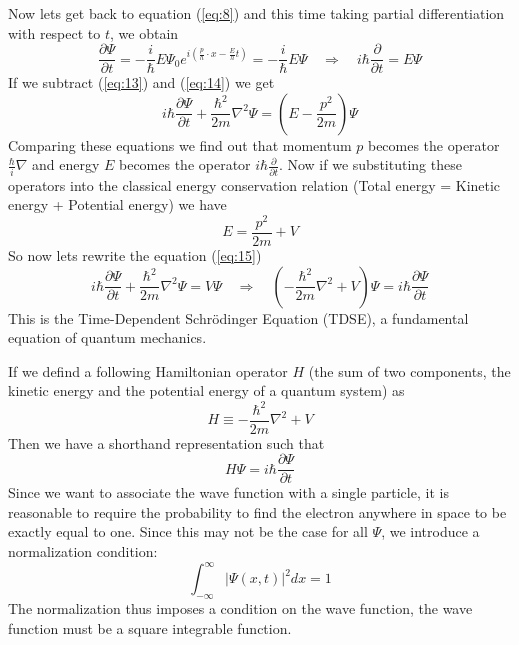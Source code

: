 \documentclass[11pt]{article}
\begin{document}
Now lets get back to equation (\ref{eq:8}) and this time taking partial differentiation with respect to $t$, we obtain
\begin{equation} \label{eq:14}
	\frac{\partial \Psi }{\partial t} = - \frac{i}{\hbar} E \Psi_0 e^{i(\frac{p}{h} \cdot x - \frac{E}{h} t)} = - \frac{i}{\hbar} E \Psi \quad \Rightarrow \quad 
	i \hbar \frac{\partial}{\partial t} = E \Psi
\end{equation}
If we subtract (\ref{eq:13}) and (\ref{eq:14}) we get
\begin{equation} \label{eq:15}
	i \hbar \frac{\partial \Psi}{\partial t} + \frac{\hbar ^2}{2m} \nabla^2 \Psi = (E - \frac{p^2}{2m}) \Psi
\end{equation}
Comparing these equations we find out that momentum $p$ becomes the operator $ \frac{\hbar}{i} \nabla$ and energy $E$ becomes the operator $ i \hbar \frac{\partial}{\partial t}$. Now if we substituting these operators into the classical energy conservation relation (Total energy = Kinetic energy + Potential energy) we have
\begin{equation}
	E = \frac{p^2}{2m} + V
\end{equation}
So now lets rewrite the equation (\ref{eq:15})
\begin{equation} \label{eq:TDSE}
	i \hbar \frac{\partial \Psi}{\partial t} + \frac{\hbar ^ 2}{2m} \nabla^2 \Psi = V \Psi \quad \Rightarrow \quad
	(- \frac{\hbar ^ 2}{2m} \nabla^2 + V) \Psi = i \hbar \frac{\partial \Psi}{\partial t}
\end{equation}
This is the Time-Dependent Schrödinger Equation (TDSE), a fundamental equation of quantum mechanics. 

If we defind a following Hamiltonian operator $H$ (the sum of two components, the kinetic energy and the potential energy of a quantum system) as 
\begin{equation}
	H \equiv - \frac{\hbar^2}{2m} \nabla^2 + V 
\end{equation}
Then we have a shorthand representation such that
\begin{equation}
	H \Psi = i \hbar \frac{\partial \Psi}{\partial t}
\end{equation}
Since we want to associate the wave function with a single particle, it is reasonable to require the probability to find the electron anywhere in space to be exactly equal to one. Since this may not be the case for all $\Psi$, we introduce a normalization condition:
\begin{equation}
	\int_{- \infty}^{\infty} | \Psi (x,t) |^2 dx = 1
\end{equation}
The normalization thus imposes a condition on the wave function, the wave function must be a square integrable function.
\end{document}

